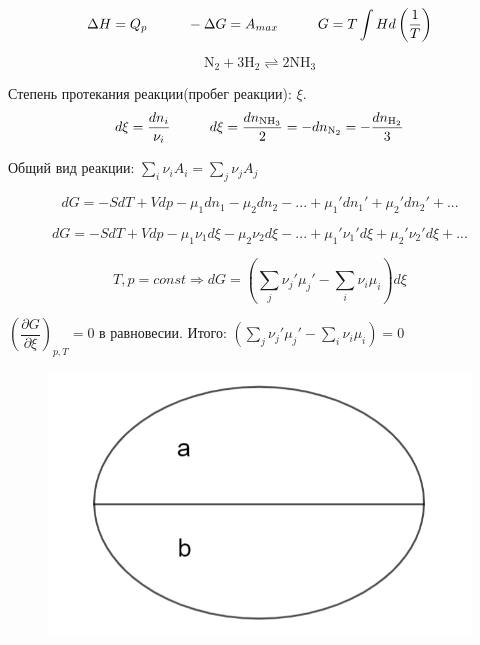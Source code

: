 \begin{lecture}
\begin{lecSection}
	\begin{equation}	
	\begin{aligned}
	\Delta H = Q_p \hspace*{1cm} -\Delta G = A_{max} \hspace*{1cm} G = T \int H d \left( \frac{1}{T}\right)
	\end{aligned}
	\end{equation}
	
	\end{lecSection}

	\begin{lecSection}[Пример]

	\begin{equation}
	\mathrm{N_2 + 3H_2 \rightleftharpoons  2NH_3}
	\end{equation}
	
	Степень протекания реакции(пробег реакции): $\xi$.
	\begin{equation}	
	\begin{aligned}
	d \xi = \frac{dn_i}{\nu_i} \hspace*{1cm} d\xi = \frac{dn_{\mathrm{NH_3}}}{2} = -dn_{\mathrm{N_2}} = -\frac{dn_{\mathrm{H_2}}}{3}
	\end{aligned}
	\end{equation}	
	
	Общий вид реакции: $\sum\limits_{i} \nu_i A_i = \sum\limits_{j} \nu_j A_j$
	
	\begin{equation}
	dG = -SdT + Vdp - \mu_1dn_1 - \mu_2dn_2 - ... + \mu_1'dn_1' + \mu_2'dn_2' + ...  
	\end{equation}
	
	\begin{equation}
	dG = -SdT + Vdp - \mu_1\nu_1d\xi - \mu_2\nu_2d\xi - ... + \mu_1'\nu_1'd\xi + \mu_2'\nu_2'd\xi + ...
	\end{equation}
	
	\begin{equation}
	T,p = const \Rightarrow dG = \left(\sum\limits_{j} \nu_j'\mu_j' - \sum\limits_{i} \nu_i\mu_i\right) d \xi
	\end{equation}
	\par $\left( \dfrac{\partial G}{\partial \xi} \right)_{p,T} = 0$ в равновесии. Итого: $(\sum\limits_{j} \nu_j'\mu_j' - \sum\limits_{i} \nu_i\mu_i) = 0$
	\begin{figure}
		\includegraphics[width=\linewidth]{lecture_02/pic2}
	\end{figure}
	

\end{lecSection}
\end{lecture}
